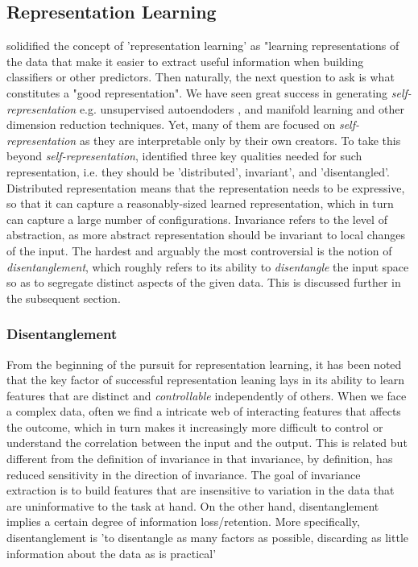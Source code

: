 \documentclass[11pt, letterpaper, oneside]{article}
\begin{document}
\subsection{Representation Learning}
 \cite{bengio_representation_2014} solidified the concept of 'representation learning' as "learning representations of the data that make it easier to extract useful information when building classifiers or other predictors. Then naturally, the next question to ask is what constitutes a "good representation". We have seen great success in generating \textit{self-representation} e.g. unsupervised autoendoders \cite{vincent_stacked_nodate},\cite{rifai_contractive_nodate} and manifold learning \cite{rifai_contractive_nodate} and other dimension reduction techniques. Yet, many of them are focused on \textit{self-representation} as they are interpretable only by their own creators. To take this beyond \textit{self-representation}, \cite{bengio_representation_2014} identified three key qualities needed for such representation, i.e. they should be 'distributed', invariant', and 'disentangled'.  Distributed representation means that the representation needs to be expressive, so that it can capture a reasonably-sized learned representation, which in turn can capture a large number of configurations. Invariance refers to the level of abstraction, as more abstract representation should be invariant to local changes of the input. The hardest and arguably the most controversial is the notion of \textit{disentanglement}, which roughly refers to its ability to \textit{disentangle} the input space so as to segregate distinct aspects of the given data. This is discussed further in the subsequent section. %
 
\subsubsection{Disentanglement}
From the beginning of the pursuit for representation learning, it has been noted that the key factor of successful representation leaning lays in its ability to learn features that are distinct and \textit{controllable} independently of others.
When we face a complex data, often we find a intricate web of interacting features that affects the outcome, which in turn makes it increasingly more difficult to control or understand the correlation between the input and the output. 
This is related but different from the definition of invariance in that invariance, by definition, has reduced sensitivity in the direction of invariance. The goal of invariance extraction is to build features that are insensitive to variation in the data that are uninformative to the task at hand. On the other hand, disentanglement implies a certain degree of information loss/retention. More specifically, disentanglement is 'to disentangle as many factors as possible, discarding as little information about the data as is practical' \cite{bengio_representation_2014} 
\end{document}
